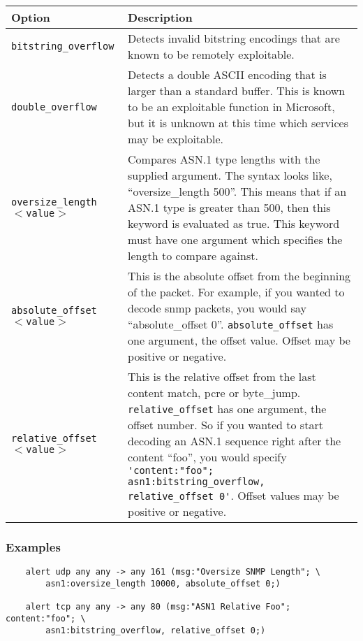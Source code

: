\documentclass[english]{report}
\begin{document}
\begin{tabular}{| l | p{4.5in} |}
\hline
{\bf Option} & {\bf Description}\\
\hline

\hline
\texttt{bitstring\_overflow} &

Detects invalid bitstring encodings that are known to be remotely exploitable.
\\

\hline
\texttt{double\_overflow} &

Detects a double ASCII encoding that is larger than a standard buffer.  This is
known to be an exploitable function in Microsoft, but it is unknown at this
time which services may be exploitable. \\

\hline
\texttt{oversize\_length $<$value$>$} &

Compares ASN.1 type lengths with the supplied argument.  The syntax looks like,
``oversize\_length 500''.  This means that if an ASN.1 type is greater than
500, then this keyword is evaluated as true.  This keyword must have one
argument which specifies the length to compare against. \\

\hline
\texttt{absolute\_offset $<$value$>$} &

This is the absolute offset from the beginning of the packet.  For example, if
you wanted to decode snmp packets, you would say ``absolute\_offset 0''.
\texttt{absolute\_offset} has one argument, the offset value.  Offset may be
positive or negative. \\  

\hline
\texttt{relative\_offset $<$value$>$} &

This is the relative offset from the last content match, pcre or byte\_jump.
\texttt{relative\_offset} has one argument, the offset number.  So if you
wanted to start decoding an ASN.1 sequence right after the content ``foo'',
you would specify \verb!'content:"foo"; asn1:bitstring_overflow, relative_offset 0'!.
Offset values may be positive or negative. \\ 

\hline
\end{tabular}

\subsubsection{Examples}

\begin{verbatim}
    alert udp any any -> any 161 (msg:"Oversize SNMP Length"; \
        asn1:oversize_length 10000, absolute_offset 0;)
        
    alert tcp any any -> any 80 (msg:"ASN1 Relative Foo"; content:"foo"; \
        asn1:bitstring_overflow, relative_offset 0;)
\end{verbatim}
\end{document}
